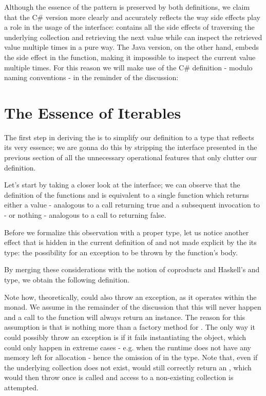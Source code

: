 
Although the essence of the pattern is preserved by both definitions, we claim that the C\# version more clearly and accurately reflects the way side effects play a role in the usage of the interface:  contains all the side effects of traversing the underlying collection and retrieving the next value while  can inspect the retrieved value multiple times in a pure way. The Java version, on the other hand, embeds the side effect in the  function, making it impossible to inspect the current value multiple times. For this reason we will make use of the C\# definition - modulo naming conventions - in the reminder of the discussion:


\section{The Essence of Iterables}

The first step in deriving the  is to simplify our  definition to a type that reflects its very essence; we are gonna do this by stripping the interface presented in the previous section of all the unnecessary operational features that only clutter our definition.

Let's start by taking a closer look at the  interface; we can observe that the definition of the functions  and  is equivalent to a single function which returns either a value - analogous to a  call returning true and a subsequent invocation to  - or nothing - analogous to a call to  returning false. 

Before we formalize this observation with a proper type, let us notice another effect that is hidden in the current definition of  and not made explicit by the its type: the possibility for an exception to be thrown by the function's body. 

By merging these considerations with the notion of coproducts and Haskell's  and  type, we obtain the following definition.


Note how, theoretically,  could also throw an exception, as it operates within the  monad. We assume in the remainder of the discussion that this will never happen and a call to the function will always return an  instance. The reason for this assumption is that  is nothing more than a factory method for . The only way it could possibly throw an exception is if it fails instantiating the object, which could only happen in extreme cases - e.g. when the runtime does not have any memory left for allocation - hence the omission of  in the type. Note that, even if the underlying collection does not exist,  would still correctly return an , which would then throw once  is called and access to a non-existing collection is attempted.

